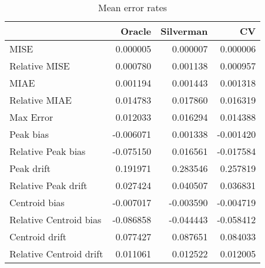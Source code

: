 \begin{table}[ht]
\centering
\begin{tabular}{lrrr}
  \hline
 & Oracle & Silverman & CV \\ 
  \hline
MISE & 0.000005 & 0.000007 & 0.000006 \\ 
  Relative MISE & 0.000780 & 0.001138 & 0.000957 \\ 
  MIAE & 0.001194 & 0.001443 & 0.001318 \\ 
  Relative MIAE & 0.014783 & 0.017860 & 0.016319 \\ 
  Max Error & 0.012033 & 0.016294 & 0.014388 \\ 
  Peak bias & -0.006071 & 0.001338 & -0.001420 \\ 
  Relative Peak bias & -0.075150 & 0.016561 & -0.017584 \\ 
  Peak drift & 0.191971 & 0.283546 & 0.257819 \\ 
  Relative Peak drift & 0.027424 & 0.040507 & 0.036831 \\ 
  Centroid bias & -0.007017 & -0.003590 & -0.004719 \\ 
  Relative Centroid bias & -0.086858 & -0.044443 & -0.058412 \\ 
  Centroid drift & 0.077427 & 0.087651 & 0.084033 \\ 
  Relative Centroid drift & 0.011061 & 0.012522 & 0.012005 \\ 
   \hline
\end{tabular}
\caption{Mean error rates} 
\label{tbl:mean_error_rates}
\end{table}
